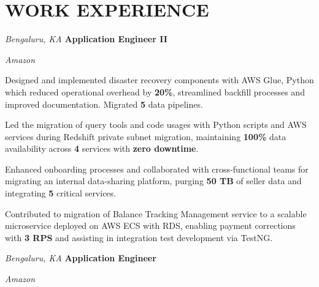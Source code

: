 \section{WORK EXPERIENCE}

\begin{twocolentry}{
    \textit{Bengaluru, KA}}
    \textbf{Application Engineer II}
    
    \textit{Amazon}
\end{twocolentry}

\vspace{0.15 cm}
\begin{onecolentry}
    \begin{highlights}
        \item Designed and implemented disaster recovery components with AWS Glue, Python which reduced operational overhead by \textbf{20\%}, streamlined backfill processes and improved documentation. Migrated \textbf{5} data pipelines.
        \item Led the migration of query tools and code usages with Python scripts and AWS services during Redshift private subnet migration, maintaining \textbf{100\%} data availability across \textbf{4} services with \textbf{zero downtime}.
        \item Enhanced onboarding processes and collaborated with cross-functional teams for migrating an internal data-sharing platform, purging \textbf{50 TB} of seller data and integrating \textbf{5} critical services.
        \item Contributed to migration of Balance Tracking Management service to a scalable microservice deployed on AWS ECS with RDS, enabling payment corrections with \textbf{3 RPS} and assisting in integration test development via TestNG.
    \end{highlights}
\end{onecolentry}

\vspace{0.15 cm}

\begin{twocolentry}{
    \textit{Bengaluru, KA}}
    \textbf{Application Engineer}
    
    \textit{Amazon}
\end{twocolentry}

\vspace{0.15 cm}

